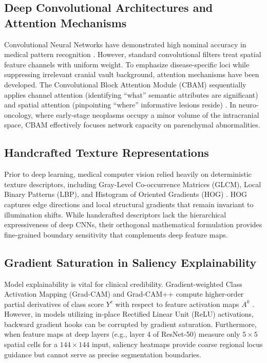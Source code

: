 \documentclass[journal,twocolumn,10pt]{IEEEtran}
\begin{document}
\subsection{Deep Convolutional Architectures and Attention Mechanisms}
Convolutional Neural Networks have demonstrated high nominal accuracy in medical pattern recognition \cite{he2016deep}. However, standard convolutional filters treat spatial feature channels with uniform weight. To emphasize disease-specific loci while suppressing irrelevant cranial vault background, attention mechanisms have been developed. The Convolutional Block Attention Module (CBAM) sequentially applies channel attention (identifying ``what'' semantic attributes are significant) and spatial attention (pinpointing ``where'' informative lesions reside) \cite{woo2018cbam}. In neuro-oncology, where early-stage neoplasms occupy a minor volume of the intracranial space, CBAM effectively focuses network capacity on parenchymal abnormalities.

\subsection{Handcrafted Texture Representations}
Prior to deep learning, medical computer vision relied heavily on deterministic texture descriptors, including Gray-Level Co-occurrence Matrices (GLCM), Local Binary Patterns (LBP), and Histogram of Oriented Gradients (HOG) \cite{dalal2005hog}. HOG captures edge directions and local structural gradients that remain invariant to illumination shifts. While handcrafted descriptors lack the hierarchical expressiveness of deep CNNs, their orthogonal mathematical formulation provides fine-grained boundary sensitivity that complements deep feature maps.

\subsection{Gradient Saturation in Saliency Explainability}
Model explainability is vital for clinical credibility. Gradient-weighted Class Activation Mapping (Grad-CAM) and Grad-CAM++ compute higher-order partial derivatives of class score $Y^c$ with respect to feature activation maps $A^k$ \cite{chattopadhay2018gradcampp}. However, in models utilizing in-place Rectified Linear Unit (ReLU) activations, backward gradient hooks can be corrupted by gradient saturation. Furthermore, when feature maps at deep layers (e.g., layer 4 of ResNet-50) measure only $5 \times 5$ spatial cells for a $144 \times 144$ input, saliency heatmaps provide coarse regional locus guidance but cannot serve as precise segmentation boundaries.
\end{document}
